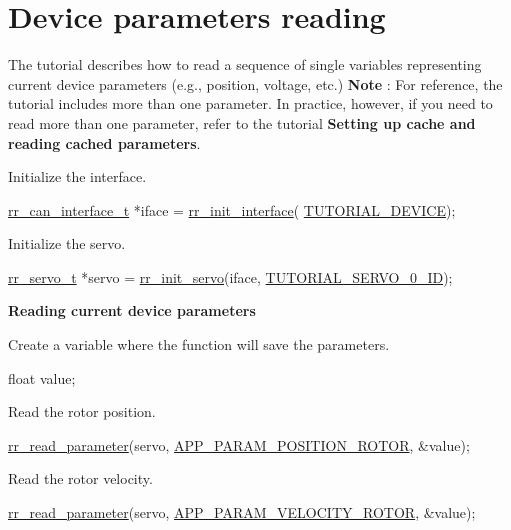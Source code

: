 \hypertarget{group__tutor__c__param}{}\section{Device parameters reading}
\label{group__tutor__c__param}
The tutorial describes how to read a sequence of single variables representing current device parameters (e.\+g., position, voltage, etc.) {\bfseries  Note }\+: For reference, the tutorial includes more than one parameter. In practice, however, if you need to read more than one parameter, refer to the tutorial {\bfseries Setting up cache and reading cached parameters}.


\begin{DoxyEnumerate}
\item Initialize the interface. 
\begin{DoxyCodeInclude}
    \hyperlink{structrr__can__interface__t}{rr\_can\_interface\_t} *iface = \hyperlink{group___init_ga472a4890dcc7d7a13123c56a06946d91}{rr\_init\_interface}(
      \hyperlink{tutorial_8h_a90947332a0345dc693905e3fc04dbeb2}{TUTORIAL\_DEVICE});
\end{DoxyCodeInclude}

\item Initialize the servo. 
\begin{DoxyCodeInclude}
    \hyperlink{structrr__servo__t}{rr\_servo\_t} *servo = \hyperlink{group___init_ga0adb313a3eeb8a4399431e940a1f3e9e}{rr\_init\_servo}(iface, 
      \hyperlink{tutorial_8h_a9a3d33f25d3a72a8e30c885d238b3b65}{TUTORIAL\_SERVO\_0\_ID});
\end{DoxyCodeInclude}
 {\bfseries  Reading current device parameters }
\item Create a variable where the function will save the parameters. 
\begin{DoxyCodeInclude}
    \textcolor{keywordtype}{float} value;
\end{DoxyCodeInclude}

\item Read the rotor position. 
\begin{DoxyCodeInclude}
    \hyperlink{group___realtime_gae665cf9423955f882e94282d66ba6a60}{rr\_read\_parameter}(servo, \hyperlink{api_8h_aa1f58887fab4642cf49f6f453c1d276daa8dafaaa373617ef2f8585b3d4177115}{APP\_PARAM\_POSITION\_ROTOR}, &value);
\end{DoxyCodeInclude}

\item Read the rotor velocity. 
\begin{DoxyCodeInclude}
    \hyperlink{group___realtime_gae665cf9423955f882e94282d66ba6a60}{rr\_read\_parameter}(servo, \hyperlink{api_8h_aa1f58887fab4642cf49f6f453c1d276dade3db1d484cf6dd69b115e37ab77051b}{APP\_PARAM\_VELOCITY\_ROTOR}, &value);
\end{DoxyCodeInclude}


\end{DoxyEnumerate}
